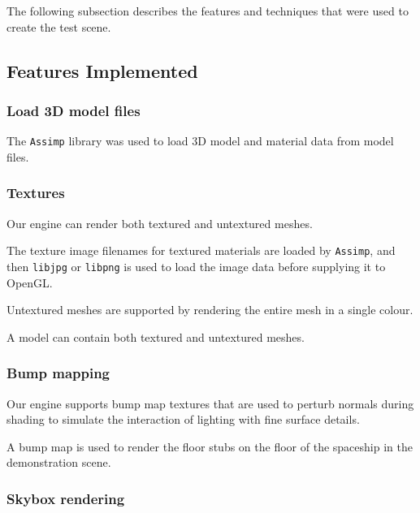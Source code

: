 \documentclass[11pt]{scrartcl} %
\newcommand{\libraryname}[1]{{\texttt{#1}}}
\begin{document}

    The following subsection describes the features and techniques that were
    used to create the test scene.

    \subsection{Features Implemented}

        \subsubsection{Load 3D model files}

            The \libraryname{Assimp} library was used to load 3D model and
            material data from model files.

        \subsubsection{Textures}

            Our engine can render both textured and untextured meshes.

            The texture image filenames for textured materials are loaded by
            \libraryname{Assimp}, and then \libraryname{libjpg} or
            \libraryname{libpng} is used to load the image data before
            supplying it to OpenGL.

            Untextured meshes are supported by rendering the entire mesh in a
            single colour.

            A model can contain both textured and untextured meshes.

        \subsubsection{Bump mapping}

            Our engine supports bump map textures that are used to perturb
            normals during shading to simulate the interaction of lighting with
            fine surface details.

            A bump map is used to render the floor stubs
            on the floor of the spaceship in the demonstration scene.

        \subsubsection{Skybox rendering}
\end{document}
